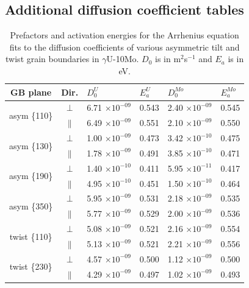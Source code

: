 \documentclass{elsarticle}
\begin{document}
\clearpage
\begin{appendices}

\setcounter{table}{0}
\renewcommand{\thetable}{A\arabic{table}}
\setcounter{figure}{0}
\renewcommand{\thefigure}{A\arabic{figure}}

\section{Additional diffusion coefficient tables}

\begin{table}[!ht]
\centering
\caption{Prefactors and activation energies for the Arrhenius equation fits to the diffusion coefficients of various asymmetric tilt and twist grain boundaries in $\gamma$U-10Mo. $D_0$ is in m$^2$s$^{-1}$ and $E_a$ is in eV.}
\label{tab:asym}
\begin{tabular}{ccllll}
\toprule
GB plane & Dir.
	& $D_{0}^U$      & $E_{a}^U$
	& $D_{0}^{Mo}$   & $E_{a}^{Mo}$ \\
\midrule
\multirow{2}{*}{ asym \{110\} }
	& $\perp$
	& 6.71 $\times 10^{-09}$ & 0.543
	& 2.40 $\times 10^{-09}$ & 0.545 \\
	& $\parallel$
	& 6.49 $\times 10^{-09}$ & 0.551
	& 2.10 $\times 10^{-09}$ & 0.550 \vspace{0.2cm } \\
\multirow{2}{*}{ asym \{130\} }
	& $\perp$
	& 1.00 $\times 10^{-09}$ & 0.473
	& 3.42 $\times 10^{-10}$ & 0.475 \\
	& $\parallel$
	& 1.78 $\times 10^{-09}$ & 0.491
	& 3.85 $\times 10^{-10}$ & 0.471 \vspace{0.2cm } \\
\multirow{2}{*}{ asym \{190\} }
	& $\perp$
	& 1.40 $\times 10^{-10}$ & 0.411
	& 5.95 $\times 10^{-11}$ & 0.417 \\
	& $\parallel$
	& 4.95 $\times 10^{-10}$ & 0.451
	& 1.50 $\times 10^{-10}$ & 0.464 \vspace{0.2cm } \\
\multirow{2}{*}{ asym \{350\} }
	& $\perp$
	& 5.95 $\times 10^{-09}$ & 0.531
	& 2.18 $\times 10^{-09}$ & 0.535 \\
	& $\parallel$
	& 5.77 $\times 10^{-09}$ & 0.529
	& 2.00 $\times 10^{-09}$ & 0.536 \vspace{0.2cm } \\
\multirow{2}{*}{ twist \{110\} }
	& $\perp$
	& 5.08 $\times 10^{-09}$ & 0.521
	& 2.16 $\times 10^{-09}$ & 0.554 \\
	& $\parallel$
	& 5.13 $\times 10^{-09}$ & 0.521
	& 2.21 $\times 10^{-09}$ & 0.556 \vspace{0.2cm } \\
\multirow{2}{*}{ twist \{230\} }
	& $\perp$
	& 4.57 $\times 10^{-09}$ & 0.500
	& 1.12 $\times 10^{-09}$ & 0.500 \\
	& $\parallel$
	& 4.29 $\times 10^{-09}$ & 0.497
	& 1.02 $\times 10^{-09}$ & 0.493 \\
\bottomrule
\end{tabular}
\end{table}


\end{appendices}
\end{document}

